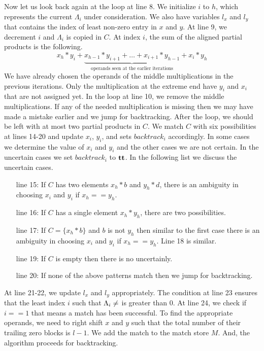 Now let us look back again at the loop at line 8.
%
We initialize $i$ to $h$, which represents the current $\Lambda_i$ under
consideration.
%
We also have variables $l_x$ and $l_y$ that contains the index of
least non-zero entry in $x$ and $y$.
%
At line 9, we decrement $i$ and $\Lambda_i$ is copied in $C$.
%
At index $i$, the sum of the aligned partial products is the following.
$$
x_{h}*y_{i} + \underbrace{x_{h-1}*y_{i+1} + \dots + x_{i+1}*y_{h-1}}_{\text{operands seen at the earlier iterations}} + x_{i}*y_{h}
$$
We have already chosen the operands of the middle multiplications in the previous iterations.
%
Only the multiplication at the extreme end have $y_i$ and $x_i$ that are
not assigned yet.
%
In the loop at line 10, we remove the middle multiplications.
%
If any of the needed multiplication is missing then we may have made a mistake
earlier and we jump for backtracking.
%
After the loop, we should be left with at most two partial products in $C$.
%
We match $C$ with six possibilities at lines 14-20 and
update $x_i$, $y_i$, and sets $backtrack_i$ accordingly.
%
In some cases we determine the value of $x_i$ and $y_i$ and the other
cases we are not certain.
%
In the uncertain cases we set $backtrack_i$ to $\mathbf{tt}$.
%
In the following list we discuss the uncertain cases.
%
\begin{itemize}
\item[line 15:] If $C$ has two elements $x_h*b$ and $y_h*d$,
there is an ambiguity in choosing $x_i$ and $y_i$
if $x_h == y_h$.
%
\item[line 16:] If $C$ has a single element $x_h*y_h$, there  
are two possibilities.
\item[line 17:] If $C = \{x_h*b\}$ and $b$ is not $y_h$ then 
  similar to the first case there is an ambiguity in
  choosing $x_i$ and $y_i$ if $x_h == y_h$. Line 18 is similar.
\item[line 19:] If $C$ is empty then there is no uncertainly. %
\item[line 20:] If none of the above patterns match then we jump for
  backtracking.
\end{itemize}
%
At line 21-22, we update $l_x$ and $l_y$ appropriately.
%
The condition at line 23 ensures that the least index $i$ such that
$\Lambda_i \neq \empty$ is greater than 0.    
%
At line 24, we check if $i==1$ that means a match has been successful.
%
To find the appropriate operands, we need to right shift $x$ and $y$
such that the total number of their trailing zero blocks is $l-1$.
%
We add the match to the match store $M$.
%
And, the algorithm proceeds for backtracking.

